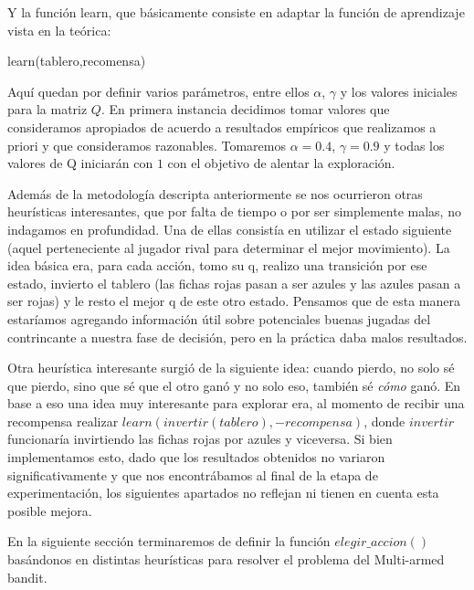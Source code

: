 Y la función learn, que básicamente consiste en adaptar la función de aprendizaje vista en la teórica:

\begin{algorithm}[h!]
\begin{algorithmic}[1]\parskip=1mm
 \caption{learn(tablero,recomensa)}
\end{algorithmic}
\end{algorithm}

Aquí quedan por definir varios parámetros, entre ellos $\alpha$, $\gamma$ y los valores iniciales para la matriz $Q$. En primera instancia decidimos tomar valores que consideramos apropiados de acuerdo a resultados empíricos que realizamos a priori y que consideramos razonables. Tomaremos $\alpha=0.4 $, $\gamma=0.9$ y todas los valores de Q iniciarán con $1$ con el objetivo de alentar la exploración.

Además de la metodología descripta anteriormente se nos ocurrieron otras heurísticas interesantes, que por falta de tiempo o por ser simplemente malas, no indagamos en profundidad. Una de ellas consistía en utilizar el estado siguiente (aquel perteneciente al jugador rival para determinar el mejor movimiento). La idea básica era, para cada acción, tomo su q, realizo una transición por ese estado, invierto el tablero (las fichas rojas pasan a ser azules y las azules pasan a ser rojas) y le resto el mejor q de este otro estado. Pensamos que de esta manera estaríamos agregando información útil sobre potenciales buenas jugadas del contrincante a nuestra fase de decisión, pero en la práctica daba malos resultados.

Otra heurística interesante surgió de la siguiente idea: cuando pierdo, no solo sé que pierdo, sino que sé que el otro ganó y no solo eso, también sé \textit{cómo} ganó. En base a eso una idea muy interesante para explorar era, al momento de recibir una recompensa realizar $learn(invertir(tablero), -recompensa)$, donde $invertir$ funcionaría invirtiendo las fichas rojas por azules y viceversa. Si bien implementamos esto, dado que los resultados obtenidos no variaron significativamente y que nos encontrábamos al final de la etapa de experimentación, los siguientes apartados no reflejan ni tienen en cuenta esta posible mejora.

En la siguiente sección terminaremos de definir la función $elegir\_accion()$ basándonos en distintas heurísticas para resolver el problema del Multi-armed bandit.

